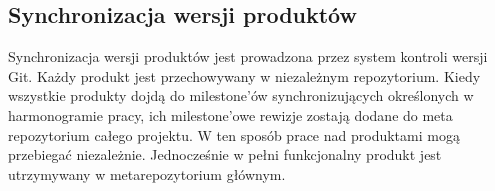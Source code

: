 \subsection{Synchronizacja wersji produktów}
Synchronizacja wersji produktów jest prowadzona przez system kontroli wersji
Git. Każdy produkt jest przechowywany w niezależnym repozytorium. Kiedy
wszystkie produkty dojdą do milestone'ów synchronizujących określonych w
harmonogramie pracy, ich milestone'owe rewizje zostają dodane do meta\dywiz
repozytorium całego projektu. W ten sposób prace nad produktami mogą przebiegać
niezależnie. Jednocześnie w pełni funkcjonalny produkt jest utrzymywany w
meta\dywiz repozytorium głównym.
